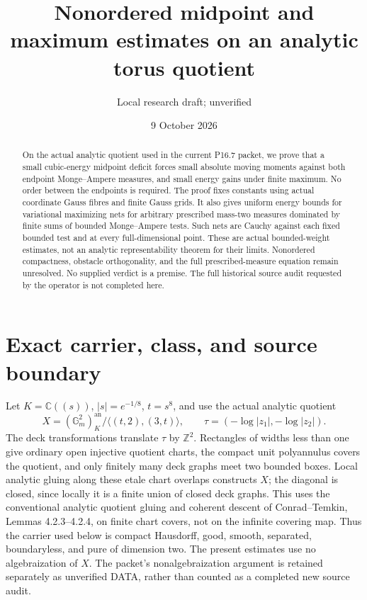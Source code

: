 \documentclass[11pt]{article}
\title{Nonordered midpoint and maximum estimates on an analytic torus quotient}
\author{Local research draft; unverified}
\date{9 October 2026}
\theoremstyle{remark}\newtheorem{remark}[theorem]{Remark}
\begin{document}
\maketitle
\begin{abstract}
On the actual analytic quotient used in the current P16.7 packet, we
prove that a small cubic-energy midpoint deficit forces small absolute
moving moments against both endpoint Monge--Ampere measures, and small
energy gains under finite maximum. No order between the endpoints is
required. The proof fixes constants using actual coordinate Gauss fibres
and finite Gauss grids. It also gives uniform energy bounds for
variational maximizing nets for arbitrary prescribed mass-two measures
dominated by finite sums of bounded Monge--Ampere tests. Such nets are
Cauchy against each fixed bounded test and at every full-dimensional
point. These are actual bounded-weight estimates, not an analytic
representability theorem for their limits. Nonordered compactness,
obstacle orthogonality, and the full prescribed-measure equation remain
unresolved. No supplied verdict is a premise. The full historical
source audit requested by the operator is not completed here.
\end{abstract}

\section{Exact carrier, class, and source boundary}
Let $K=\mathbb C((s))$, $|s|=e^{-1/8}$, $t=s^8$, and use the
actual analytic quotient
\[
 X=(\mathbb G_m^2)^{\mathrm{an}}_K/\langle(t,2),(3,t)\rangle,
 \qquad \tau=(-\log|z_1|,-\log|z_2|).
\]
The deck transformations translate $\tau$ by $\mathbb Z^2$.
Rectangles of widths less than one give ordinary open injective
quotient charts, the compact unit polyannulus covers the quotient,
and only finitely many deck graphs meet two bounded boxes. Local
analytic gluing along these etale chart overlaps constructs $X$;
the diagonal is closed, since locally it is a finite union of closed
deck graphs. This uses the conventional analytic quotient gluing and
coherent descent of Conrad--Temkin, Lemmas 4.2.3--4.2.4, on finite
chart covers, not on the infinite covering map. Thus the carrier used
below is compact Hausdorff, good, smooth, separated, boundaryless,
and pure of dimension two. The present estimates use no algebraization
of $X$. The packet's nonalgebraization argument is retained separately
as unverified DATA, rather than counted as a completed new source audit.
\end{document}
